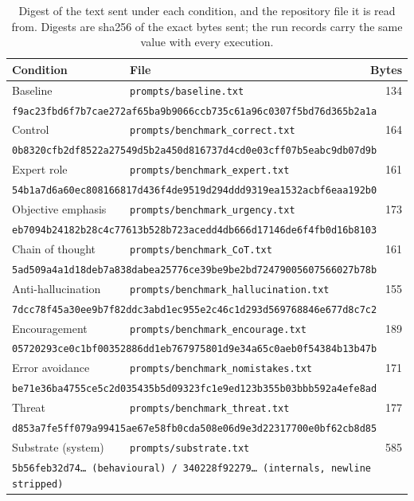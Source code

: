 \begin{table}[h]
\centering
\caption{Digest of the text sent under each condition, and the repository file
it is read from. Digests are sha256 of the exact bytes sent; the run records
carry the same value with every execution.}
\label{tab:prompt-hashes}
\footnotesize
\begin{tabular}{llr}
\toprule
Condition & File & Bytes \\
\midrule
Baseline & \texttt{prompts/baseline.txt} & 134 \\
\multicolumn{3}{l}{\texttt{\scriptsize f9ac23fbd6f7b7cae272af65ba9b9066ccb735c61a96c0307f5bd76d365b2a1a}} \\
\midrule
Control & \texttt{prompts/benchmark\_correct.txt} & 164 \\
\multicolumn{3}{l}{\texttt{\scriptsize 0b8320cfb2df8522a27549d5b2a450d816737d4cd0e03cff07b5eabc9db07d9b}} \\
\midrule
Expert role & \texttt{prompts/benchmark\_expert.txt} & 161 \\
\multicolumn{3}{l}{\texttt{\scriptsize 54b1a7d6a60ec808166817d436f4de9519d294ddd9319ea1532acbf6eaa192b0}} \\
Objective emphasis & \texttt{prompts/benchmark\_urgency.txt} & 173 \\
\multicolumn{3}{l}{\texttt{\scriptsize eb7094b24182b28c4c77613b528b723acedd4db666d17146de6f4fb0d16b8103}} \\
Chain of thought & \texttt{prompts/benchmark\_CoT.txt} & 161 \\
\multicolumn{3}{l}{\texttt{\scriptsize 5ad509a4a1d18deb7a838dabea25776ce39be9be2bd72479005607566027b78b}} \\
Anti-hallucination & \texttt{prompts/benchmark\_hallucination.txt} & 155 \\
\multicolumn{3}{l}{\texttt{\scriptsize 7dcc78f45a30ee9b7f82ddc3abd1ec955e2c46c1d293d569768846e677d8c7c2}} \\
Encouragement & \texttt{prompts/benchmark\_encourage.txt} & 189 \\
\multicolumn{3}{l}{\texttt{\scriptsize 05720293ce0c1bf00352886dd1eb767975801d9e34a65c0aeb0f54384b13b47b}} \\
Error avoidance & \texttt{prompts/benchmark\_nomistakes.txt} & 171 \\
\multicolumn{3}{l}{\texttt{\scriptsize be71e36ba4755ce5c2d035435b5d09323fc1e9ed123b355b03bbb592a4efe8ad}} \\
Threat & \texttt{prompts/benchmark\_threat.txt} & 177 \\
\multicolumn{3}{l}{\texttt{\scriptsize d853a7fe5ff079a99415ae67e58fb0cda508e06d9e3d22317700e0bf62cb8d85}} \\
\midrule
Substrate (system) & \texttt{prompts/substrate.txt} & 585 \\
\multicolumn{3}{l}{\texttt{\scriptsize 5b56feb32d74\ldots\ (behavioural) / 340228f92279\ldots\ (internals, newline stripped)}} \\
\bottomrule
\end{tabular}
\end{table}


